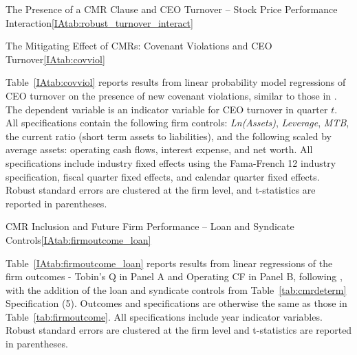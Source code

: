 \documentclass[12pt]{article}
\begin{document}
\begin{appendices}
\begin{singlespace}
\begin{papertable}{The Presence of a CMR Clause and CEO Turnover -- Stock Price Performance Interaction}{\ref{IAtab:robust_turnover_interact}}{}
\end{papertable}

\begin{papertable}{The Mitigating Effect of CMRs: Covenant Violations and CEO Turnover}{\ref{IAtab:covviol}}{}
  \label{IAtab:covviol}

  Table~\ref{IAtab:covviol} reports results from linear probability model regressions of CEO turnover on the presence of new covenant violations, similar to those in \cite{Nini_2012}.
  The dependent variable is an indicator variable for CEO turnover in quarter $t$.
  All specifications contain the following firm controls: \textit{Ln(Assets)}, \textit{Leverage}, \textit{MTB}, the current ratio (short term assets to liabilities), and the following scaled by average assets: operating cash flows, interest expense, and net worth.
  All specifications include industry fixed effects using the Fama-French 12 industry specification, fiscal quarter fixed effects, and calendar quarter fixed effects.
  Robust standard errors are clustered at the firm level, and t-statistics are reported in parentheses.
  \postamblesig

  \startdata
  

\end{papertable}




\begin{landscapepapertable}{CMR Inclusion and Future Firm Performance -- Loan and Syndicate Controls}{\ref{IAtab:firmoutcome_loan}}{\skipline}
  \label{IAtab:firmoutcome_loan}

  Table~\ref{IAtab:firmoutcome_loan} reports results from linear regressions of the firm outcomes - Tobin's Q in Panel A and Operating CF in Panel B, following \cite{Nini_2009}, with the addition of the loan and syndicate controls from Table~\ref{tab:cmrdeterm} Specification (5).
  Outcomes and specifications are otherwise the same as those in Table~\ref{tab:firmoutcome}.
  All specifications include year indicator variables.
  Robust standard errors are clustered at the firm level and t-statistics are reported in parentheses.
  \postamble


\end{landscapepapertable}
\end{singlespace}
\end{appendices}
\end{document}

